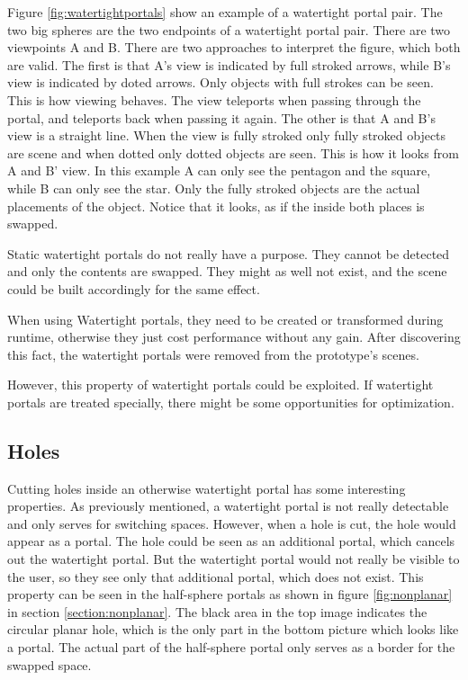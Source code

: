 Figure \ref{fig:watertightportals} show an example of a watertight portal pair. The two big spheres are the two endpoints of a watertight portal pair. There are two viewpoints A and B.
There are two approaches to interpret the figure, which both are valid.
The first is that A's view is indicated by full stroked arrows, while B's view is indicated by doted arrows. Only objects with full strokes can be seen. This is how viewing behaves. The view teleports when passing through the portal, and teleports back when passing it again.
The other is that A and B's view is a straight line. When the view is fully stroked only fully stroked objects are scene and when dotted only dotted objects are seen. This is how it looks from A and B' view.
In this example A can only see the pentagon and the square, while B can only see the star. Only the fully stroked objects are the actual placements of the object. Notice that it looks, as if the inside both places is swapped.

Static watertight portals do not really have a purpose. They cannot be detected and only the contents are swapped. They might as well not exist, and the scene could be built accordingly for the same effect.

When using Watertight portals, they need to be created or transformed during runtime, otherwise they just cost performance without any gain. After discovering this fact, the watertight portals were removed from the prototype's scenes.

However, this property of watertight portals could be exploited. If watertight portals are treated specially, there might be some opportunities for optimization.

\subsection{Holes}
Cutting holes inside an otherwise watertight portal has some interesting properties. As previously mentioned, a watertight portal is not really detectable and only serves for switching spaces. However, when a hole is cut, the hole would appear as a portal. The hole could be seen as an additional portal, which cancels out the watertight portal. But the watertight portal would not really be visible to the user, so they see only that additional portal, which does not exist. This property can be seen in the half-sphere portals as shown in figure \ref{fig:nonplanar} in section \ref{section:nonplanar}. The black area in the top image indicates the circular planar hole, which is the only part in the bottom picture which looks like a portal. The actual part of the half-sphere portal only serves as a border for the swapped space.
